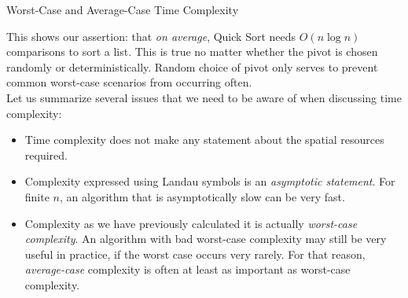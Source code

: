 \documentclass[smaller,hyperref={CJKbookmarks=true}]{beamer}
\begin{document}
\begin{frame}[t]{Worst-Case and Average-Case Time Complexity}
\begin{spacing}{1.1}
This shows our assertion: that \emph{on average}, Quick Sort needs $O(n \log n)$
comparisons to sort a list. This is true no matter whether the pivot is
chosen randomly or deterministically. Random choice of pivot only serves
to prevent common worst-case scenarios from occurring often.\\[5pt]
Let us summarize several issues that we need to be aware of when
discussing time complexity:
\begin{itemize}
  \item Time complexity does not make any statement about the spatial resources required.
  \item Complexity expressed using Landau symbols is an \emph{asymptotic statement}. For finite $n$, an algorithm that is asymptotically slow can be very fast.
  \item Complexity as we have previously calculated it is actually \emph{worst-case complexity}. An algorithm with bad worst-case complexity may still be very useful in practice, if the worst case occurs very rarely. For that reason, \emph{average-case} complexity is often at least as important as worst-case complexity.
\end{itemize}
\end{spacing}
\end{frame}
\end{document}
